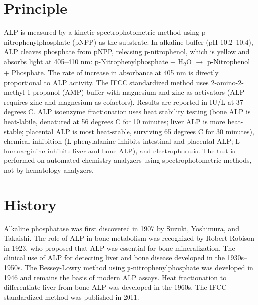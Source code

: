\section*{Principle}
ALP is measured by a kinetic spectrophotometric method using p-nitrophenylphosphate (pNPP) as the substrate. In alkaline buffer (pH 10.2--10.4), ALP cleaves phosphate from pNPP, releasing p-nitrophenol, which is yellow and absorbs light at 405--410 nm: p-Nitrophenylphosphate + H\textsubscript{2}O $\rightarrow$ p-Nitrophenol + Phosphate. The rate of increase in absorbance at 405 nm is directly proportional to ALP activity. The IFCC standardized method uses 2-amino-2-methyl-1-propanol (AMP) buffer with magnesium and zinc as activators (ALP requires zinc and magnesium as cofactors). Results are reported in IU/L at 37 degrees C. ALP isoenzyme fractionation uses heat stability testing (bone ALP is heat-labile, denatured at 56 degrees C for 10 minutes; liver ALP is more heat-stable; placental ALP is most heat-stable, surviving 65 degrees C for 30 minutes), chemical inhibition (L-phenylalanine inhibits intestinal and placental ALP; L-homoarginine inhibits liver and bone ALP), and electrophoresis. The test is performed on automated chemistry analyzers using spectrophotometric methods, not by hematology analyzers.

\section*{History}
Alkaline phosphatase was first discovered in 1907 by Suzuki, Yoshimura, and Takaishi. The role of ALP in bone metabolism was recognized by Robert Robison in 1923, who proposed that ALP was essential for bone mineralization. The clinical use of ALP for detecting liver and bone disease developed in the 1930s--1950s. The Bessey-Lowry method using p-nitrophenylphosphate was developed in 1946 and remains the basis of modern ALP assays. Heat fractionation to differentiate liver from bone ALP was developed in the 1960s. The IFCC standardized method was published in 2011.

